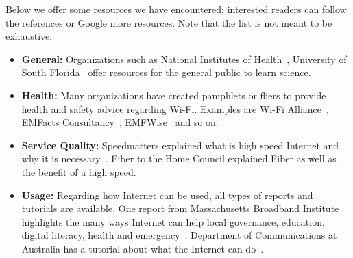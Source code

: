 Below we offer some resources we have encountered; interested readers can follow
the references or Google more resources. Note that the list is not meant to be
exhaustive.

\begin{itemize}
\item {\bf General:} Organizations such as National Institutes of
Health~\cite{nih}, University of South Florida~\cite{usf} offer resources for
the general public to learn science.

\item {\bf Health:} Many organizations have created pamphlets or fliers to
  provide health and safety advice regarding Wi-Fi. Examples are Wi-Fi
  Alliance~\cite{wifi2015health}, EMFacts
  Consultancy~\cite{emfacts2015wireless}, EMFWise~\cite{emfwise} and so on.

\item {\bf Service Quality:} Speedmatters explained what is high speed Internet
  and why it is necessary~\cite{speedmatters}. Fiber to the Home Council
  explained Fiber as well as the benefit of a high speed.

\item {\bf Usage:} Regarding how Internet can be used, all types of reports and
  tutorials are available. One report from Massachusetts Broadband Institute
  highlights the many ways Internet can help local governance, education,
  digital literacy, health and emergency~\cite{masstech}. Department of
  Communications at Australia has a tutorial about what the Internet can
  do~\cite{internetbasics}.

\end{itemize}


